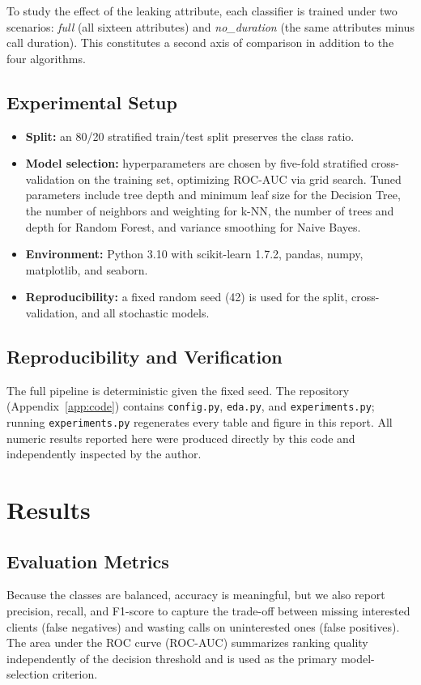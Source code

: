 \documentclass[conference]{IEEEtran}
\begin{document}
	To study the effect of the leaking attribute, each classifier is trained under
	two scenarios: \emph{full} (all sixteen attributes) and \emph{no\_duration}
	(the same attributes minus call duration). This constitutes a second axis of
	comparison in addition to the four algorithms.

	\subsection{Experimental Setup}
	\begin{itemize}
		\item \textbf{Split:} an 80/20 stratified train/test split preserves the
		class ratio.
		\item \textbf{Model selection:} hyperparameters are chosen by five-fold
		stratified cross-validation on the training set, optimizing ROC-AUC via
		grid search. Tuned parameters include tree depth and minimum leaf size for
		the Decision Tree, the number of neighbors and weighting for k-NN, the
		number of trees and depth for Random Forest, and variance smoothing for
		Naive Bayes.
		\item \textbf{Environment:} Python 3.10 with scikit-learn 1.7.2, pandas,
		numpy, matplotlib, and seaborn.
		\item \textbf{Reproducibility:} a fixed random seed (42) is used for the
		split, cross-validation, and all stochastic models.
	\end{itemize}

	\subsection{Reproducibility and Verification}
	The full pipeline is deterministic given the fixed seed. The repository
	(Appendix~\ref{app:code}) contains \texttt{config.py}, \texttt{eda.py}, and
	\texttt{experiments.py}; running \texttt{experiments.py} regenerates every
	table and figure in this report. All numeric results reported here were
	produced directly by this code and independently inspected by the author.

	\section{Results}
	\label{sec:results}

	\subsection{Evaluation Metrics}
	Because the classes are balanced, accuracy is meaningful, but we also report
	precision, recall, and F1-score to capture the trade-off between missing
	interested clients (false negatives) and wasting calls on uninterested ones
	(false positives). The area under the ROC curve (ROC-AUC) summarizes ranking
	quality independently of the decision threshold and is used as the primary
	model-selection criterion.
\end{document}

